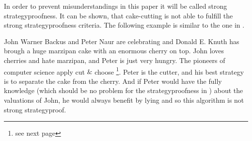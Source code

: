 In order to prevent misunderstandings in this paper it will be called strong strategyproofness. It can be shown, that cake-cutting is not able to fulfill the strong strategyproofness criteria. The following example is similar to the one in \cite{chen:truth}.\\

\begin{bsp}
John Warner Backus and Peter Naur are celebrating and Donald E. Knuth has brough a huge marzipan cake with an enormous cherry on top. John loves cherries and hate marzipan, and Peter is just very hungry. The pioneers of computer science apply cut $\&$ choose \footnote{see next page}. Peter is the cutter, and his best strategy is to separate the cake from the cherry. And if Peter would have the fully knowledge (which should be no problem for the strategyproofness in \cite{why}) about the valuations of John, he would always benefit by lying and so this algorithm is not strong strategyproof.  
\end{bsp}

